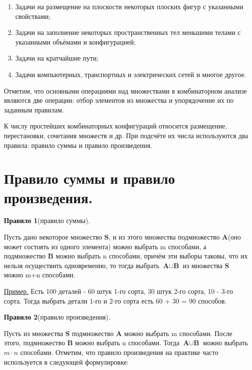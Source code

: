 \documentclass[12pt, a4paper, oneside]{article}
\theoremstyle{plain} %
\theoremstyle{definition}
\newcommand{\indef}[1]{\textbf{ \color{dark_red} #1}}
\begin{document}
\begin{enumerate}
    
    \item Задачи на размещение на плоскости некоторых плоских фигур с указанными свойствами;
    
    \item Задачи на заполнение некоторых пространственных тел меньшими телами с указанными объёмами и конфигурацией;
    
    \item Задачи на кратчайшие пути;
    
    \item Задачи компьютерных, транспортных и электрических сетей и многое другое.

\end{enumerate}

Отметим, что основными операциями над множествами в комбинаторном анализе являются две операции: отбор элементов из множества и упорядочение их по заданным правилам.\par 
К числу простейших комбинаторных конфигураций относится размещение, перестановки, сочетания множеств и др. При подсчёте их числа используются два правила: правило суммы и правило произведения.

\section{Правило суммы и правило произведения.}


\indef{Правило 1}(правило суммы).\par
Пусть дано некоторое множество \textbf{S}, и из этого множества подмножество \textbf{A}(оно может состоять из одного элемента) можно выбрать m способами, а подмножество \textbf{B} можно выбрать n способами, причём эти выборы таковы, что их нельзя осуществить одновременно, то тогда выбрать $\textbf{A} \cup \textbf{B}$ из множества \textbf{S} можно m+n способами.\par 

\underline{Пример.} Есть 100 деталей - 60 штук 1-го сорта, 30 штук 2-го сорта, 10 - 3-го сорта. Тогда выбрать детали 1-го и 2-го сорта есть 60 + 30 = 90 способов.

\indef{Правило 2}(правило произведения). \par 
Пусть из множества \textbf{S} подмножество \textbf{A} можно выбрать m способами. После этого, подмножество \textbf{B} можно выбрать n способами. Тогда $\textbf{A} \cup \textbf{B}$ можно выбрать $m \cdot n$ способами. Отметим, что правило произведения на практике часто используется в следующей формулировке: \par 
\end{document}
